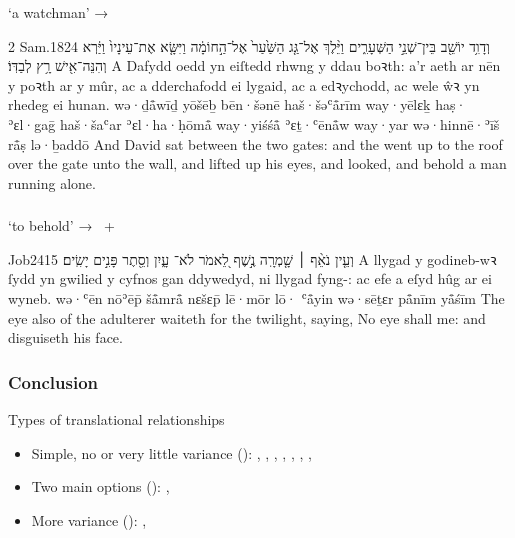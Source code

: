 \begin{frame}{\ex {} ‘a watchman’ → }
	\begin{example}{2 Sam.}{18}{24}{}{}
		\quoling
		{וְדָוִ֥ד יוֹשֵׁ֖ב בֵּין־שְׁנֵ֣י הַשְּׁעָרִ֑ים וַיֵּ֨לֶךְ  אֶל־גַּ֤ג הַשַּׁ֙עַר֙ אֶל־הַ֣חוֹמָ֔ה וַיִּשָּׂ֤א אֶת־עֵינָיו֙ וַיַּ֔רְא וְהִנֵּה־אִ֖ישׁ רָ֥ץ לְבַדּֽוֹ׃}
		{A Dafydd oedd yn eiſtedd rhwng y ddau boꝛth: a’r  aeth ar nēn y poꝛth ar y mûr, ac a dderchafodd ei lygaid, ac a edꝛychodd, ac wele ŵꝛ yn rhedeg ei hunan.}
		{wə·ḏå̄wīḏ yōšēḇ bēn·šənē haš·šəʿå̄rīm way·yēlɛḵ haṣ· ʾɛl·gaḡ haš·šaʿar ʾɛl·ha·ḥōmå̄ way·yiśśå̄ ʾɛṯ·ʿēnå̄w way·yar wə·hinnē·ʾīš rå̄ṣ lə·ḇaddō}
		{And David sat between the two gates: and the  went up to the roof over the gate unto the wall, and lifted up his eyes, and looked, and behold a man running alone.}
	\end{example}
\end{frame}



\subsubsection{}

\begin{frame}{\ex {} ‘to behold’ → ~+ }
	\begin{example}{Job}{24}{15}{}{}
		\quoling
		{וְעֵ֤ין נֹאֵ֨ף ׀ שָׁ֤מְרָֽה נֶ֣שֶׁף לֵ֭אמֹר לֹא־ עָ֑יִן וְסֵ֖תֶר פָּנִ֣ים יָשִֽׂים׃}
		{A llygad y godineb-wꝛ ſydd yn gwilied y cyfnos gan ddywedyd, ni  llygad fyng-: ac efe a eſyd hûg ar ei wyneb.}
		{wə·ʿēn nōʾēp̄ šå̄mrå̄ nɛšɛp̄ lē·mōr lō· ʿå̄yin wə·sēṯɛr på̄nīm yå̄śīm}
		{The eye also of the adulterer waiteth for the twilight, saying, No eye shall  me: and disguiseth his face.}
	\end{example}
\end{frame}


\subsubsection{Conclusion}

\begin{frame}{\hopoint Types of translational relationships}
	\begin{itemize}
		\item Simple, no or very little variance (\typeC):
			, , , , , ,
			, 
		\item Two main options (\typeA):
			, 
		\item More variance (\typeB):
			, 
	\end{itemize}
\end{frame}
